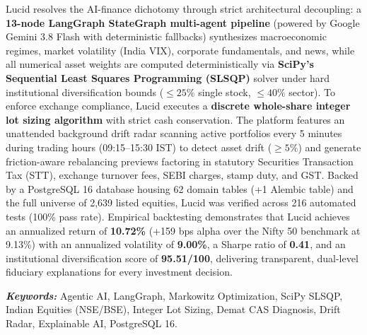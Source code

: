 \documentclass[12pt, a4paper, openright, twoside]{report}
\providecommand{\keywords}[1]{\textbf{\textit{Keywords:}} #1}
\begin{document}
Lucid resolves the AI-finance dichotomy through strict architectural decoupling: a \textbf{13-node LangGraph StateGraph multi-agent pipeline} (powered by Google Gemini 3.8 Flash with deterministic fallbacks) synthesizes macroeconomic regimes, market volatility (India VIX), corporate fundamentals, and news, while all numerical asset weights are computed deterministically via \textbf{SciPy's Sequential Least Squares Programming (SLSQP)} solver under hard institutional diversification bounds ($\le 25\%$ single stock, $\le 40\%$ sector). To enforce exchange compliance, Lucid executes a \textbf{discrete whole-share integer lot sizing algorithm} with strict cash conservation. The platform features an unattended background drift radar scanning active portfolios every 5 minutes during trading hours (09:15--15:30 IST) to detect asset drift ($\ge 5\%$) and generate friction-aware rebalancing previews factoring in statutory Securities Transaction Tax (STT), exchange turnover fees, SEBI charges, stamp duty, and GST. Backed by a PostgreSQL 16 database housing 62 domain tables (+1 Alembic table) and the full universe of 2,639 listed equities, Lucid was verified across 216 automated tests (100\% pass rate). Empirical backtesting demonstrates that Lucid achieves an annualized return of \textbf{10.72\%} (+159 bps alpha over the Nifty 50 benchmark at 9.13\%) with an annualized volatility of \textbf{9.00\%}, a Sharpe ratio of \textbf{0.41}, and an institutional diversification score of \textbf{95.51/100}, delivering transparent, dual-level fiduciary explanations for every investment decision.

\vspace{0.6cm}
\noindent \keywords{Agentic AI, LangGraph, Markowitz Optimization, SciPy SLSQP, Indian Equities (NSE/BSE), Integer Lot Sizing, Demat CAS Diagnosis, Drift Radar, Explainable AI, PostgreSQL 16.}

\clearpage
\thispagestyle{empty}
\null
\newpage

\renewcommand*{\contentsname}{\MakeUppercase{Contents}}
\renewcommand*{\listfigurename}{\MakeUppercase{List of Figures}}
\renewcommand*{\listtablename}{\MakeUppercase{List of Tables}}
\renewcommand{\bibname}{REFERENCES}
\thispagestyle{plain}
\tableofcontents
\cleardoublepage
\end{document}
